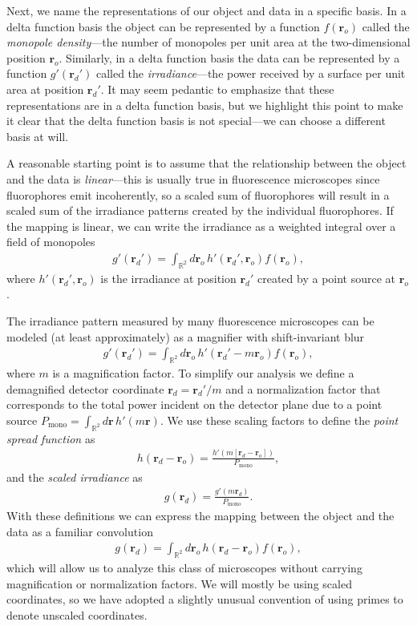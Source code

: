 \documentclass[]{osa-article}
\providecommand{\mb}[1]{\mathbf{#1}}
\providecommand{\ro}{\mathbf{\mathbf{r}}_o}
\providecommand{\rd}{\mathbf{r}_d}
\providecommand{\mbb}[1]{\mathbb{#1}}
\begin{document}
Next, we name the representations of our object and data in a specific basis. In
a delta function basis the object can be represented by a function $f(\ro)$
called the \textit{monopole density}---the number of monopoles per unit area at
the two-dimensional position $\ro$. Similarly, in a delta function basis the
data can be represented by a function $g'(\rd')$ called the
\textit{irradiance}---the power received by a surface per unit area at position
$\rd'$. It may seem pedantic to emphasize that these representations are in a
delta function basis, but we highlight this point to make it clear that the
delta function basis is not special---we can choose a different basis at will.

A reasonable starting point is to assume that the relationship between the
object and the data is \textit{linear}---this is usually true in fluorescence
microscopes since fluorophores emit incoherently, so a scaled sum of
fluorophores will result in a scaled sum of the irradiance patterns created by
the individual fluorophores. If the mapping is linear, we can write the
irradiance as a weighted integral over a field of monopoles
\begin{align}
g'(\rd') = \int_{\mbb{R}^2}d\ro\, h'(\rd',\ro)f(\ro), \label{eq:fwdmono}
\end{align}
where $h'(\rd{}', \ro{})$ is the irradiance at position $\rd'$ created by a
point source at $\ro$.

The irradiance pattern measured by many fluorescence microscopes can be modeled
(at least approximately) as a magnifier with shift-invariant blur
\begin{align}
  g'(\rd') = \int_{\mbb{R}^2}d\ro\, h'(\rd' - m\ro)f(\ro), 
\end{align}
where $m$ is a magnification factor. To simplify our analysis we define a
demagnified detector coordinate $\rd = \rd'/m$ and a normalization factor that
corresponds to the total power incident on the detector plane due to a point
source $P_{\text{mono}} = \int_{\mbb{R}^2}d\mb{r}\,h'(m\mb{r})$. We use these scaling
factors to define the \textit{point spread function} as
\begin{align}
  h(\rd - \ro) = \frac{h'(m[\rd - \ro])}{P_{\text{mono}}},
\end{align}
and the \textit{scaled irradiance} as
\begin{align}
  g(\rd) = \frac{g'(m\rd)}{P_{\text{mono}}}.
\end{align}
With these definitions we can express the mapping between the object and the
data as a familiar convolution
\begin{align}
  g(\rd) = \int_{\mbb{R}^2}d\ro\, h(\rd - \ro)f(\ro),  \label{eq:lsi}
\end{align}
which will allow us to analyze this class of microscopes without carrying
magnification or normalization factors. We will mostly be using scaled
coordinates, so we have adopted a slightly unusual convention of using primes to
denote unscaled coordinates.
\end{document}
